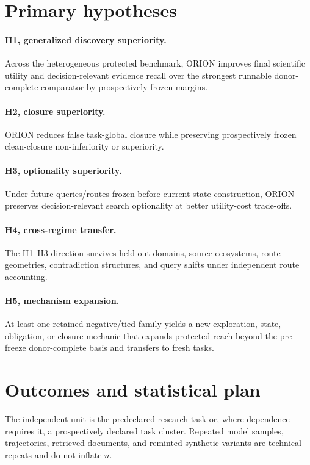 \documentclass[11pt]{article}
\begin{document}
\section{Primary hypotheses}
\paragraph{H1, generalized discovery superiority.}
Across the heterogeneous protected benchmark, ORION improves final scientific utility and decision-relevant evidence recall over the strongest runnable donor-complete comparator by prospectively frozen margins.

\paragraph{H2, closure superiority.}
ORION reduces false task-global closure while preserving prospectively frozen clean-closure non-inferiority or superiority.

\paragraph{H3, optionality superiority.}
Under future queries/routes frozen before current state construction, ORION preserves decision-relevant search optionality at better utility-cost trade-offs.

\paragraph{H4, cross-regime transfer.}
The H1--H3 direction survives held-out domains, source ecosystems, route geometries, contradiction structures, and query shifts under independent route accounting.

\paragraph{H5, mechanism expansion.}
At least one retained negative/tied family yields a new exploration, state, obligation, or closure mechanic that expands protected reach beyond the pre-freeze donor-complete basis and transfers to fresh tasks.

\section{Outcomes and statistical plan}
The independent unit is the predeclared research task or, where dependence requires it, a prospectively declared task cluster. Repeated model samples, trajectories, retrieved documents, and reminted synthetic variants are technical repeats and do not inflate $n$.
\end{document}
